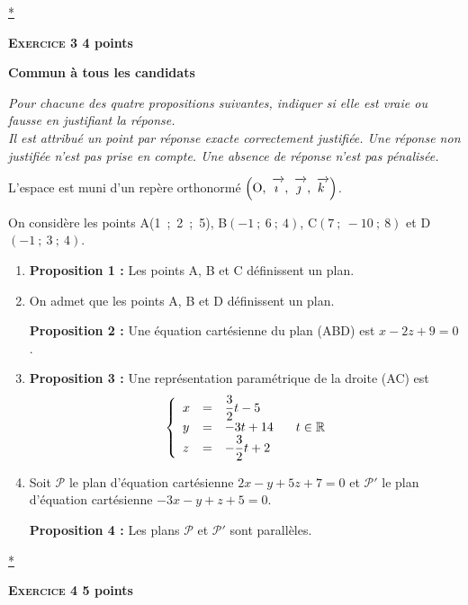 \documentclass[10pt]{article}
\newcommand{\R}{\mathbb{R}}
\newcommand{\vect}[1]{\mathchoice%
{\overrightarrow{\displaystyle\mathstrut#1\,\,}}%
{\overrightarrow{\textstyle\mathstrut#1\,\,}}%
{\overrightarrow{\scriptstyle\mathstrut#1\,\,}}%
{\overrightarrow{\scriptscriptstyle\mathstrut#1\,\,}}}
\def\Oijk{$\left(\text{O},~\vect{\imath},~\vect{\jmath},~\vect{k}\right)$}
\begin{document}
\hyperlink{Index}{*}
\vspace{0,5cm}

\textbf{\textsc{Exercice 3} \hfill 4 points}
 
\textbf{Commun à tous les candidats}

\medskip 

\emph{Pour chacune des quatre propositions suivantes, indiquer si elle est vraie ou fausse en justifiant la réponse.\\ 
Il est attribué un point par réponse exacte correctement justifiée. Une réponse non justifiée n'est pas prise en compte. Une absence de réponse n'est pas pénalisée.}

\medskip
 
L'espace est muni d'un repère orthonormé \Oijk.
 
On considère les points A(1~;~2~;~5), B$(-1~;~6~;~4)$, C$(7~;~- 10~;~8)$ et D$(-1~;~3~;~4)$.

\medskip
 
\begin{enumerate}
\item \textbf{Proposition 1 :} Les points A, B et C définissent un plan. 
\item On admet que les points A, B et D définissent un plan. 

\textbf{Proposition 2 :} Une équation cartésienne du plan (ABD) est $x - 2z + 9 = 0$. 
\item \textbf{Proposition 3 :} Une représentation paramétrique de la droite (AC) est 
\[\left\{\begin{array}{l c l} 
x &=& \dfrac{3}{2}t - 5\\ 
y &=& - 3t + 14\\
z &=&- \dfrac{3}{2}t + 2
\end{array}\right. \quad  t \in \R\]
 
\item Soit $\mathcal{P}$ le plan d'équation cartésienne $2x - y + 5z + 7 = 0$ et $\mathcal{P}'$ le plan d'équation cartésienne $- 3x - y + z + 5 = 0$.
 
\textbf{Proposition 4 :} Les plans $\mathcal{P}$ et $\mathcal{P}'$ sont parallèles. 
\end{enumerate}

\hyperlink{Index}{*}

\vspace{0,5cm}

\textbf{\textsc{Exercice 4} \hfill 5 points}
 
\end{document}
